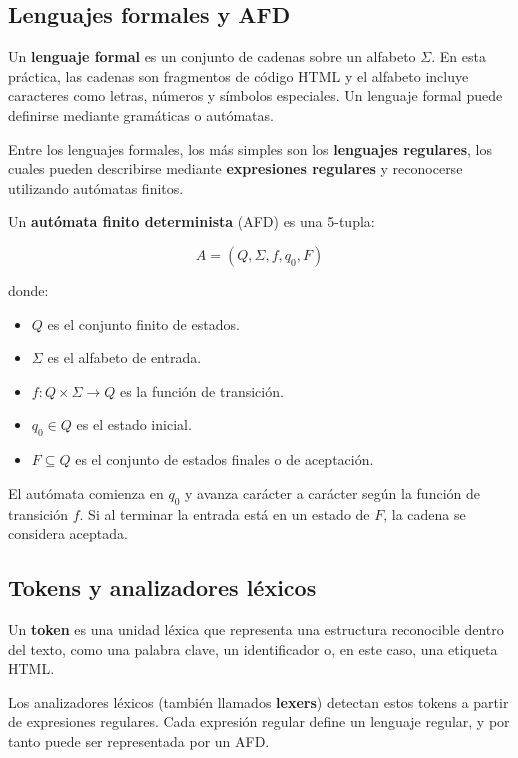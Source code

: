 \documentclass[11pt,a4paper]{article}
\begin{document}
\subsection{Lenguajes formales y AFD}

Un \textbf{lenguaje formal} es un conjunto de cadenas sobre un alfabeto $\Sigma$. En esta práctica, las cadenas son fragmentos de código HTML y el alfabeto incluye caracteres como letras, números y símbolos especiales. Un lenguaje formal puede definirse mediante gramáticas o autómatas.

Entre los lenguajes formales, los más simples son los \textbf{lenguajes regulares}, los cuales pueden describirse mediante \textbf{expresiones regulares} y reconocerse utilizando autómatas finitos.

Un \textbf{autómata finito determinista} (AFD) es una 5-tupla:

\[
A = (Q, \Sigma, f, q_0, F)
\]

donde:
\begin{itemize}\setlength\itemsep{0.2em}
    \item $Q$ es el conjunto finito de estados.
    \item $\Sigma$ es el alfabeto de entrada.
    \item $f: Q \times \Sigma \rightarrow Q$ es la función de transición.
    \item $q_0 \in Q$ es el estado inicial.
    \item $F \subseteq Q$ es el conjunto de estados finales o de aceptación.
\end{itemize}

El autómata comienza en $q_0$ y avanza carácter a carácter según la función de transición $f$. Si al terminar la entrada está en un estado de $F$, la cadena se considera aceptada.

\subsection{Tokens y analizadores léxicos}

Un \textbf{token} es una unidad léxica que representa una estructura reconocible dentro del texto, como una palabra clave, un identificador o, en este caso, una etiqueta HTML.

Los analizadores léxicos (también llamados \textbf{lexers}) detectan estos tokens a partir de expresiones regulares. Cada expresión regular define un lenguaje regular, y por tanto puede ser representada por un AFD.

\medskip
\end{document}
